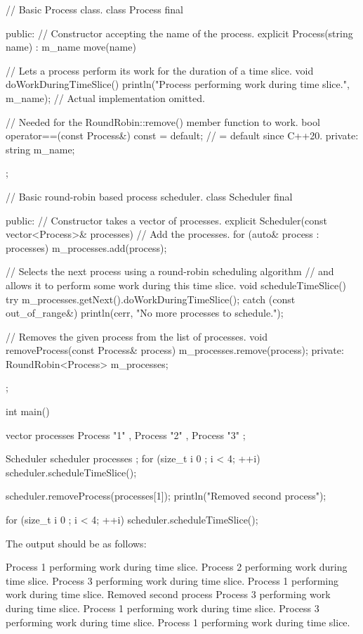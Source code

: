 \begin{cpp}
// Basic Process class.
class Process final
{
    public:
        // Constructor accepting the name of the process.
        explicit Process(string name) : m_name { move(name) } {}

        // Lets a process perform its work for the duration of a time slice.
        void doWorkDuringTimeSlice()
        {
            println("Process {} performing work during time slice.", m_name);
            // Actual implementation omitted.
        }

        // Needed for the RoundRobin::remove() member function to work.
        bool operator==(const Process&) const = default; // = default since C++20.
    private:
        string m_name;
};

// Basic round-robin based process scheduler.
class Scheduler final
{
    public:
        // Constructor takes a vector of processes.
        explicit Scheduler(const vector<Process>& processes)
        {
            // Add the processes.
            for (auto& process : processes) { m_processes.add(process); }
        }

        // Selects the next process using a round-robin scheduling algorithm
        // and allows it to perform some work during this time slice.
        void scheduleTimeSlice()
        {
            try {
                m_processes.getNext().doWorkDuringTimeSlice();
            } catch (const out_of_range&) {
                println(cerr, "No more processes to schedule.");
            }
        }

        // Removes the given process from the list of processes.
        void removeProcess(const Process& process)
        {
            m_processes.remove(process);
        }
    private:
        RoundRobin<Process> m_processes;
};

int main()
{
    vector processes { Process { "1" }, Process { "2" }, Process { "3" } };

    Scheduler scheduler { processes };
    for (size_t i { 0 }; i < 4; ++i) { scheduler.scheduleTimeSlice(); }

    scheduler.removeProcess(processes[1]);
    println("Removed second process");

    for (size_t i { 0 }; i < 4; ++i) { scheduler.scheduleTimeSlice(); }
}
\end{cpp}

The output should be as follows:

\begin{shell}
Process 1 performing work during time slice.
Process 2 performing work during time slice.
Process 3 performing work during time slice.
Process 1 performing work during time slice.
Removed second process
Process 3 performing work during time slice.
Process 1 performing work during time slice.
Process 3 performing work during time slice.
Process 1 performing work during time slice.
\end{shell}

